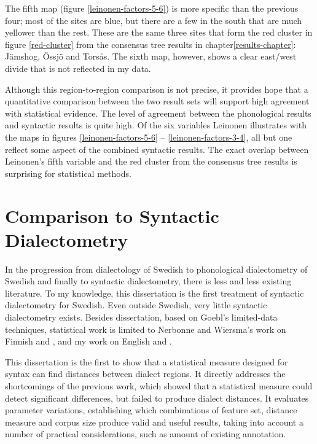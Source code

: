 The fifth map (figure \ref{leinonen-factors-5-6}) is more specific
than the previous four; most of the sites are blue, but there are a
few in the south that are much yellower than the rest. These are the
same three sites that form the red cluster in figure \ref{red-cluster}
from the consensus tree results in chapter\ref{results-chapter}:
J\"amshog, \"Ossj\"o and Tors\aa{}s. The sixth map, however, shows a
clear east/west divide that is not reflected in my data.

Although this region-to-region comparison is not precise, it provides
hope that a quantitative comparison between the two result sets will
support high agreement with statistical evidence. The level of
agreement between the phonological results and syntactic results is
quite high. Of the six variables Leinonen illustrates with the maps in
figures \ref{leinonen-factors-5-6} -- \ref{leinonen-factors-3-4}, all
but one reflect some aspect of the combined syntactic results. The
exact overlap between Leinonen's fifth variable and the red cluster
from the consensus tree results is surprising for statistical methods.

\section{Comparison to Syntactic Dialectometry}

In the progression from dialectology of Swedish to phonological
dialectometry of Swedish and finally to syntactic dialectometry, there
is less and less existing literature. To my knowledge, this
dissertation is the first treatment of syntactic dialectometry for
Swedish. Even outside Swedish, very little syntactic dialectometry
exists. Besides  dissertation, based on Goebl's
limited-data techniques, statistical work is limited to Nerbonne and
Wiersma's work on Finnish \cite{nerbonne06} and \cite{wiersma09}, and
my work on English \cite{sanders07} and \cite{sanders08b}.

This dissertation is the first to show that a statistical measure
designed for syntax can find distances between dialect regions. It
directly addresses the shortcomings of the previous work, which showed
that a statistical measure could detect significant differences, but failed to
produce dialect distances. It evaluates
parameter variations, establishing which combinations of feature set,
distance measure and corpus size produce valid and useful results,
taking into account a number of practical considerations, such as
amount of existing annotation.

